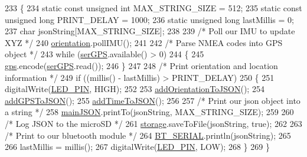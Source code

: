 \begin{DoxyCode}
233 \{
234   \textcolor{keyword}{static} \textcolor{keyword}{const} \textcolor{keywordtype}{unsigned} \textcolor{keywordtype}{int} MAX\_STRING\_SIZE = 512;
235   \textcolor{keyword}{static} \textcolor{keyword}{const} \textcolor{keywordtype}{unsigned} \textcolor{keywordtype}{long} PRINT\_DELAY = 1000;
236   \textcolor{keyword}{static} \textcolor{keywordtype}{unsigned} \textcolor{keywordtype}{long} lastMillis = 0;
237   \textcolor{keywordtype}{char} jsonString[MAX\_STRING\_SIZE];
238 
239   \textcolor{comment}{/* Poll our IMU to update XYZ */}
240   \hyperlink{logging-device_8ino_a47be0262307aa023a1bda3d98986a16d}{orientation}.pollIMU();
241 
242   \textcolor{comment}{/* Parse NMEA codes into GPS object */}
243   \textcolor{keywordflow}{while} (\hyperlink{logging-device_8ino_aa2475f51bdc0f31d16d2916991d618d9}{serGPS}.available() > 0)
244   \{
245     \hyperlink{logging-device_8ino_a169c53997a7da1d0fb99aec1b4675ce8}{gps}.encode(\hyperlink{logging-device_8ino_aa2475f51bdc0f31d16d2916991d618d9}{serGPS}.read());
246   \}
247 
248   \textcolor{comment}{/* Print orientation and location information */}
249   \textcolor{keywordflow}{if} ((millis() - lastMillis) > PRINT\_DELAY)
250   \{
251     digitalWrite(\hyperlink{logging-device_8ino_ab4553be4db9860d940f81d7447173b2f}{LED\_PIN}, HIGH);
252 
253     \hyperlink{logging-device_8ino_a8d3614b16b26b9734d79e9f8f6695af3}{addOrientationToJSON}();
254     \hyperlink{logging-device_8ino_af1705fad6a6282b24379a174e18d4fe4}{addGPSToJSON}();
255     \hyperlink{logging-device_8ino_a9e4931f452cd25dfff67d41e7c9c0efb}{addTimeToJSON}();
256 
257     \textcolor{comment}{/* Print our json object into a string */}
258     \hyperlink{logging-device_8ino_a5eebfb3b76a83174d0f5d032d1f6bfb7}{mainJSON}.printTo(jsonString, MAX\_STRING\_SIZE);
259 
260     \textcolor{comment}{/* Log JSON to the microSD */}
261     \hyperlink{logging-device_8ino_a40059244119c00baa1b841119cfd1b2e}{storage}.saveToFile(jsonString, \textcolor{keyword}{true});
262 
263     \textcolor{comment}{/* Print to our bluetooth module */}
264     \hyperlink{logging-device_8ino_ad1e6e6f6fc813b305067b9e1b0777ea6}{BT\_SERIAL}.println(jsonString);
265 
266     lastMillis = millis();
267     digitalWrite(\hyperlink{logging-device_8ino_ab4553be4db9860d940f81d7447173b2f}{LED\_PIN}, LOW);
268   \}
269 \}
\end{DoxyCode}
\mbox{\label{logging-device_8ino_a8d3614b16b26b9734d79e9f8f6695af3}} 
